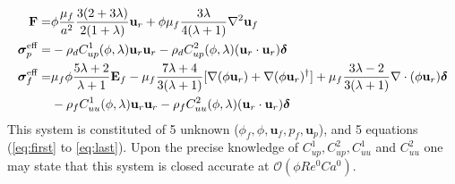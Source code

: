 \begin{align}
    \textbf{F}=&
    \phi
    \frac{\mu_f}{a^2}
    \frac{3(2+3\lambda)}{2(1+\lambda)}\textbf{u}_r
    + \phi\mu_f  \frac{3\lambda}{4(\lambda +1)} \grad^2 \textbf{u}_f\\
    \bm\sigma_p^\text{eff}
    =&
    -\rho_d C^1_{up}(\phi,\lambda) \textbf{u}_r \textbf{u}_r
    -\rho_d C^2_{up}(\phi,\lambda) (\textbf{u}_r \cdot \textbf{u}_r)\bm\delta\\
    \bm\sigma_f^\text{eff}
    =&
     \mu_f \phi \frac{5\lambda +2}{\lambda+1} \textbf{E}_f
    - \mu_f \frac{7\lambda +4}{3(\lambda+1)} [
    \grad(\phi \textbf{u}_r)
    + \grad(\phi \textbf{u}_r)^\dagger]
    + \mu_f \frac{3\lambda - 2}{3(\lambda+1)} \div(\phi \textbf{u}_r)  \bm\delta\nonumber\\
    &-\rho_f C^1_{uu}(\phi,\lambda)  \textbf{u}_r \textbf{u}_r
    -\rho_f C^2_{uu} (\phi,\lambda) (\textbf{u}_r \cdot \textbf{u}_r)\bm\delta
    \label{eq:sigma_feffff}
\end{align}
This system is constituted of 5 unknown ($\phi_f,\phi,\textbf{u}_f,p_f,\textbf{u}_p$), and 5 equations (\ref{eq:first} to \ref{eq:last}).  
Upon the precise knowledge of $C^1_{up}, C^2_{up}, C^1_{uu}$ and $C^2_{uu}$ one may state that this system is closed accurate at $\mathcal{O}(\phi Re^0 Ca^0)$. 

